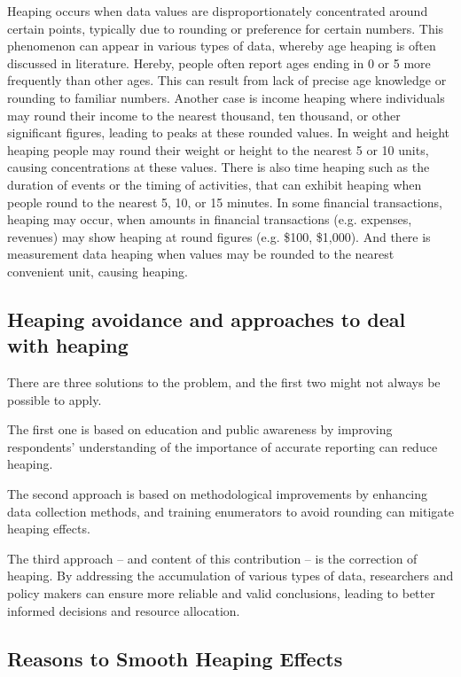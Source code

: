 \documentclass[pdflatex,sn-mathphys-num]{sn-jnl}%
\theoremstyle{thmstyleone}%
\theoremstyle{thmstyletwo}%
\theoremstyle{thmstylethree}%
\begin{document}
Heaping occurs when data values are disproportionately concentrated around certain points, typically due to rounding or preference for certain numbers. This phenomenon can appear in various types of data, whereby age heaping is often discussed in literature. Hereby, people often report ages ending in 0 or 5 more frequently than other ages. This can result from lack of precise age knowledge or rounding to familiar numbers. Another case is income heaping where individuals may round their income to the nearest thousand, ten thousand, or other significant figures, leading to peaks at these rounded values. In weight and height heaping people may round their weight or height to the nearest 5 or 10 units, causing concentrations at these values. There is also time heaping such as the duration of events or the timing of activities, that can exhibit heaping when people round to the nearest 5, 10, or 15 minutes. In some financial transactions, heaping may occur, when amounts in financial transactions (e.g. expenses, revenues) may show heaping at round figures (e.g. \$100, \$1,000).
And there is measurement data heaping when values may be rounded to the nearest convenient unit, causing heaping.

\subsection{Heaping avoidance and approaches to deal with heaping}

There are three solutions to the problem, and the first two might not always be possible to apply. 

The first one is based on education and public awareness by improving respondents' understanding of the importance of accurate reporting can reduce heaping.

The second approach is based on methodological improvements by enhancing data collection methods, and training enumerators to avoid rounding can mitigate heaping effects.

The third approach -- and content of this contribution -- is the correction of heaping. By addressing the accumulation of various types of data, researchers and policy makers can ensure more reliable and valid conclusions, leading to better informed decisions and resource allocation.



\subsection{Reasons to Smooth Heaping Effects}
\end{document}
